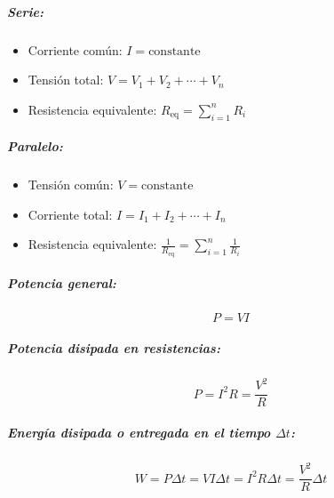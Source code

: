 \begin{tcolorbox}[title=Circuitos]
  \subparagraph{Serie:}
  \begin{itemize}
    \item Corriente común: \( I = \text{constante} \)
    \item Tensión total: \( V = V_1 + V_2 + \cdots + V_n \)
    \item Resistencia equivalente: \(R_{\text{eq}} = \sum_{i=1}^{n} R_i\)
  \end{itemize}
  
  \subparagraph{Paralelo:}
  \begin{itemize}
    \item Tensión común: \( V = \text{constante} \)
    \item Corriente total: \( I = I_1 + I_2 + \cdots + I_n \)
    \item Resistencia equivalente: \(\frac{1}{R_{\text{eq}}} = \sum_{i=1}^{n} \frac{1}{R_i}\)
  \end{itemize}
\end{tcolorbox}


\begin{tcolorbox}[title=Trabajo y Potencia eléctrica]
  \subparagraph{Potencia general:}  
  
  \[
    P = V I
  \]
  
  \subparagraph{Potencia disipada en resistencias:}  
  \[
    P = I^2 R = \frac{V^2}{R}
  \]
  
  \subparagraph{Energía disipada o entregada en el tiempo \( \Delta t \):}
  \[
    W = P \Delta t = V I \Delta t = I^2 R \Delta t = \frac{V^2}{R} \Delta t
  \]
\end{tcolorbox}
